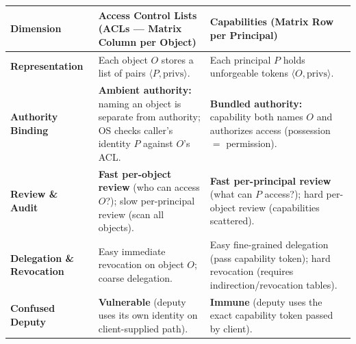 \begin{table}[h!]
\centering
\footnotesize
\begin{tabularx}{\textwidth}{@{}L{3.0cm} Y Y@{}}
\toprule
\textbf{Dimension} & \textbf{Access Control Lists (ACLs --- Matrix Column per Object)} & \textbf{Capabilities (Matrix Row per Principal)} \\
\midrule
\textbf{Representation} & Each object $O$ stores a list of pairs $\langle P, \text{privs} \rangle$. & Each principal $P$ holds unforgeable tokens $\langle O, \text{privs} \rangle$. \\
\textbf{Authority Binding} & \textbf{Ambient authority:} naming an object is separate from authority; OS checks caller's identity $P$ against $O$'s ACL. & \textbf{Bundled authority:} capability both names $O$ and authorizes access (possession $=$ permission). \\
\textbf{Review \& Audit} & \textbf{Fast per-object review} (who can access $O$?); slow per-principal review (scan all objects). & \textbf{Fast per-principal review} (what can $P$ access?); hard per-object review (capabilities scattered). \\
\textbf{Delegation \& Revocation} & Easy immediate revocation on object $O$; coarse delegation. & Easy fine-grained delegation (pass capability token); hard revocation (requires indirection/revocation tables). \\
\textbf{Confused Deputy} & \textbf{Vulnerable} (deputy uses its own identity on client-supplied path). & \textbf{Immune} (deputy uses the exact capability token passed by client). \\
\bottomrule
\end{tabularx}
\end{table}

